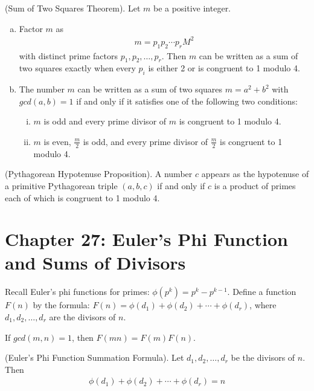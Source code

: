 \documentclass[graybox]{svmult}
\begin{document}
\begin{svgraybox}
\begin{theorem}
(Sum of Two Squares Theorem). Let $m$ be a positive integer.
\begin{enumerate}[(a)]
\item Factor $m$ as
\begin{align*}
m=p_1p_2\cdots p_rM^2
\end{align*}
with distinct prime factors $p_1, p_2, \ldots, p_r$. Then $m$ can be written as a sum of two squares exactly when every $p_i$ is either 2 or is congruent to 1 modulo 4.
\item The number $m$ can be written as a sum of two squares $m=a^2+b^2$ with $gcd(a,b)=1$ if and only if it satisfies one of the following two conditions:
\begin{enumerate}[(i)]
\item $m$ is odd and every prime divisor of $m$ is congruent to 1 modulo 4.
\item $m$ is even, $\frac{m}{2}$ is odd, and every prime divisor of $\frac{m}{2}$ is congruent to 1 modulo 4.
\end{enumerate}
\end{enumerate}
\end{theorem}
\end{svgraybox}

\begin{theorem}
(Pythagorean Hypotenuse Proposition). A number $c$ appears as the hypotenuse of a primitive Pythagorean triple $(a,b,c)$ if and only if $c$ is a product of primes each of which is congruent to 1 modulo 4.
\end{theorem}

\section*{Chapter 27: Euler's Phi Function and Sums of Divisors}

Recall Euler's phi functions for primes: $\phi(p^k) = p^k -p^{k-1}$.
Define a function $F(n)$ by the formula: $F(n)=\phi(d_1)+\phi(d_2)+\cdots + \phi(d_r)$, where $d_1, d_2, \ldots , d_r$ are the divisors of $n$.

\begin{lemma}
If $gcd(m,n)=1$, then $F(mn)=F(m)F(n)$.
\end{lemma}

\begin{theorem}
(Euler's Phi Function Summation Formula). Let $d_1, d_2, \ldots, d_r$ be the divisors of $n$. Then
\begin{align*}
\phi(d_1)+\phi(d_2)+\cdots +\phi(d_r)=n
\end{align*}
\end{theorem}
\end{document}
